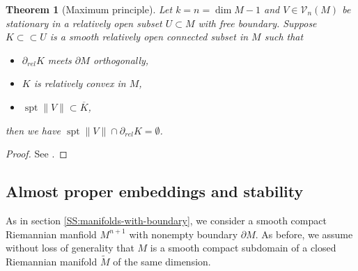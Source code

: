 \documentclass[10pt]{amsart}
\newtheorem{theorem}{Theorem}[section]
\theoremstyle{definition}
\newtheorem{definition}[theorem]{Definition}
\theoremstyle{remark}
\numberwithin{equation}{section}
\newcommand{\V}{\mathcal{V}}
\newcommand{\tM}{\widetilde{M}}
\newcommand{\spt}{\operatorname{spt}}
\begin{document}

\begin{theorem}[Maximum principle]
\label{T:max-principle}
Let $k=n= \dim M -1$ and $V \in \V_n(M)$ be stationary in a relatively open subset $U \subset M$ with free boundary. Suppose $K \subset \subset U$ is a smooth relatively open connected subset in $M$ such that
\begin{itemize}
\item[(i)] $\partial_{rel} K$ meets $\partial M$ orthogonally,
\item[(ii)] $K$ is relatively convex in $M$,
\item[(iii)] $\spt \|V\| \subset \overline{K}$,
\end{itemize}
then we have $\spt \|V\| \cap \partial_{rel} K = \emptyset$.
\end{theorem}

\begin{proof}
See \cite{max-principle}.
\end{proof}


\subsection{Almost proper embeddings and stability}
\label{SS:properness}

As in section \ref{SS:manifolds-with-boundary}, we consider a smooth compact Riemannian manfiold $M^{n+1}$ with nonempty boundary $\partial M$. As before, we assume without loss of generality that $M$ is a smooth compact subdomain of a closed Riemannian manifold $\tM$ of the same dimension. 
\end{document}
